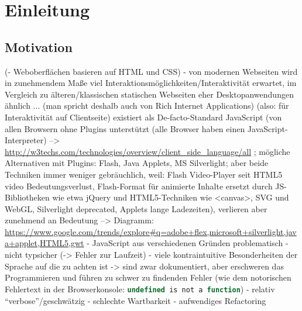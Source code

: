 \documentclass[a4paper, 12pt, hidelinks, listof=totoc, listoftables=totoc, bibliography=totoc]{scrreprt}
\newcommand{\js}[1]{\lstinline[language=JavaScript, style=inline]|#1|}
\begin{document}



\tableofcontents

\newpage

\pagestyle{scrheadings}




\chapter{Einleitung}



\section{Motivation}


(- Weboberflächen basieren auf HTML und CSS)
- von modernen Webseiten wird in zunehmendem Maße viel Interaktionsmöglichkeiten/Interaktivität erwartet, im Vergleich zu älteren/klassischen statischen Webseiten eher Desktopanwendungen ähnlich ... (man spricht deshalb auch von Rich Internet Applications) (also: für Interaktivität auf Clientseite) existiert als De-facto-Standard JavaScript (von allen Browsern ohne Plugins unterstützt (alle Browser haben einen JavaScript-Interpreter)
-->  \url{http://w3techs.com/technologies/overview/client_side_language/all}
; mögliche Alternativen mit Plugins: Flash, Java Applets, MS Silverlight; aber beide Techniken immer weniger gebräuchlich, weil: Flash Video-Player seit HTML5 video Bedeutungsverlust, Flash-Format für animierte Inhalte ersetzt durch JS-Bibliotheken wie etwa jQuery und HTML5-Techniken wie <canvas>, SVG und WebGL, Silverlight deprecated, Applets lange Ladezeiten), verlieren aber zunehmend an Bedeutung  -->  Diagramm:   \url{https://www.google.com/trends/explore#q=adobe+flex,microsoft+silverlight,java+applet,HTML5,gwt}
- JavaScript aus verschiedenen Gründen problematisch
  - nicht typsicher (-> Fehler zur Laufzeit)
  - viele kontraintuitive Besonderheiten der Sprache auf die zu achten ist -> sind zwar dokumentiert, aber erschweren das Programmieren und führen zu schwer zu findenden Fehler (wie dem notorischen Fehlertext in der Browserkonsole: \js{undefined is not a function})
  - relativ "`verbose"'/geschwätzig
  - schlechte Wartbarkeit
  - aufwendiges Refactoring
\end{document}
